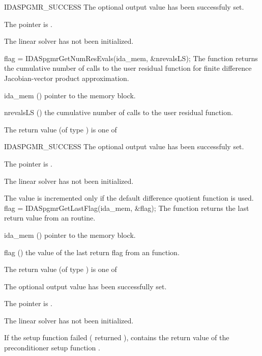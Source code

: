 {{  \begin{args}
  \item[IDASPGMR\_SUCCESS] 
    The optional output value has been successfuly set.
  \item[\Id{IDASPGMR\_MEM\_NULL}]
    The  pointer is .
  \item[\Id{IDASPGMR\_LMEM\_NULL}]
    The {\idaspgmr} linear solver has not been initialized.
  \end{args}
}
{}
{
  flag = IDASpgmrGetNumResEvals(ida\_mem, \&nrevalsLS);
}
{
  The function  returns the
  cumulative number of calls to the user residual function for
  finite difference Jacobian-vector product approximation.
}
{
  \begin{args}[nrevalsLS]
  \item[ida\_mem] ()
    pointer to the {\ida} memory block.
  \item[nrevalsLS] ()
    the cumulative number of calls to the user residual function.
  \end{args}
}
{
  The return value  (of type ) is one of
  \begin{args}
  \item[IDASPGMR\_SUCCESS] 
    The optional output value has been successfuly set.
  \item[\Id{IDASPGMR\_MEM\_NULL}]
    The  pointer is .
  \item[\Id{IDASPGMR\_LMEM\_NULL}]
    The {\idaspgmr} linear solver has not been initialized.
  \end{args}
}
{
  The value  is incremented only if the default 
   difference quotient function is used.
}
{
  flag = IDASpgmrGetLastFlag(ida\_mem, \&flag);
}
{
  The function  returns the
  last return value from an {\idaspgmr} routine. 
}
{
  \begin{args}
  \item[ida\_mem] ()
    pointer to the {\ida} memory block.
  \item[flag] ()
    the value of the last return flag from an {\idaspgmr} function.
  \end{args}
}
{
  The return value  (of type ) is one of
  \begin{args}
  \item[\Id{IDASPGMR\_SUCCESS}] 
    The optional output value has been successfully set.
  \item[\Id{IDASPGMR\_MEM\_NULL}]
    The  pointer is .
  \item[\Id{IDASPGMR\_LMEM\_NULL}]
    The {\idaspgmr} linear solver has not been initialized.
  \end{args}
}
{
  If the {\idaspgmr} setup function failed ( 
  returned ),
   contains the return value of the preconditioner 
  setup function .

}}

